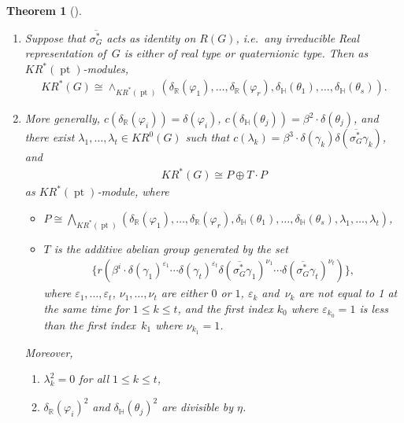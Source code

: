 \documentclass[11pt]{article}
\numberwithin{equation}{section}
\newtheorem{Theorem}{Theorem}[section]
\DeclareMathOperator{\pt}{pt}
\begin{document}
\begin{Theorem}[{\cite[Theorem 5.6]{Se}}]
\label{krtheorymodofg}\quad
\begin{enumerate}\itemsep=0pt
\item[$1.$]
Suppose that $\overline{\sigma_G^*}$ acts as identity on $R(G)$, i.e.\
any irreducible Real representation of~$G$ is either of real type or quaternionic type.
Then as $KR^*(\pt)$-modules,
\begin{gather*}
KR^*(G)\cong\wedge_{KR^*(\pt)}(\delta_\mathbb{R}(\varphi_1), \dots, \delta_\mathbb{R}(\varphi_r),
\delta_\mathbb{H}(\theta_1), \dots, \delta_\mathbb{H}(\theta_s)).
\end{gather*}
\item[$2.$]
More generally, $c(\delta_\mathbb{R}(\varphi_i))=\delta(\varphi_i)$,
$c(\delta_\mathbb{H}(\theta_j))=\beta^2\cdot\delta(\theta_j)$, and there exist $\lambda_1, \dots, \lambda_t\in KR^0(G)$
such that $c(\lambda_k)=\beta^3\cdot\delta(\gamma_k)\delta(\overline{\sigma_G^*}
\gamma_k)$, and
\begin{gather*}
KR^*(G)\cong P\oplus T\cdot P
\end{gather*}
as $KR^*(\pt)$-module, where
\begin{itemize}\itemsep=0pt
\item
$P\cong\bigwedge_{KR^*(\pt)}(\delta_\mathbb{R}(\varphi_1), \dots, \delta_\mathbb{R}(\varphi_r),
\delta_\mathbb{H}(\theta_1), \dots, \delta_\mathbb{H}(\theta_s), \lambda_1, \dots, \lambda_t)$,
\item
$T$ is the additive abelian group generated by the set
\begin{gather*}
\{r(\beta^i\cdot\delta(\gamma_1)^{\varepsilon_1}\cdots\delta(\gamma_t)^{\varepsilon_t}\delta(\overline{\sigma_G^*}
\gamma_1)^{\nu_1}\cdots\delta(\overline{\sigma_G^*}\gamma_t)^{\nu_t})\},
\end{gather*}
where $\varepsilon_1, \dots, \varepsilon_t$, $\nu_1, \dots, \nu_t$ are either $0$ or $1$, $\varepsilon_k$ and~$\nu_k$ are not
equal to 1 at the same time for $1\leq k\leq t$, and the first index $k_0$ where $\varepsilon_{k_0}=1$ is less than the
first index~$k_1$ where $\nu_{k_1}=1$.
\end{itemize}
Moreover,
\begin{enumerate}\itemsep=0pt
\item[$(a)$]
$\lambda_k^2=0$ for all $1\leq k\leq t$,
\item[$(b)$]
$\delta_\mathbb{R}(\varphi_i)^2$ and $\delta_\mathbb{H}(\theta_j)^2$ are divisible by $\eta$.
\end{enumerate}
\end{enumerate}
\end{Theorem}
\end{document}
